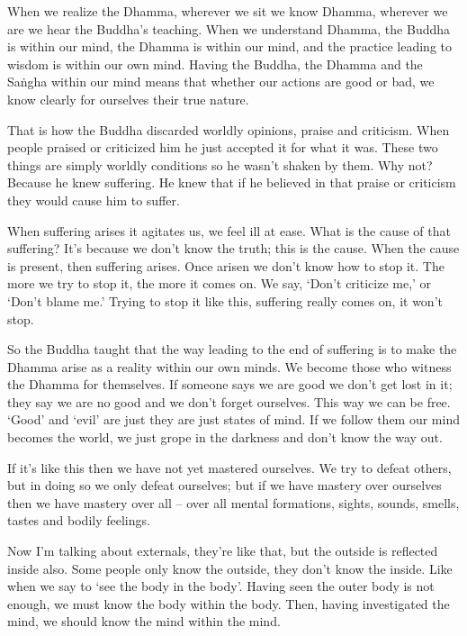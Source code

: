 When we realize the Dhamma, wherever we sit we know Dhamma, wher\-ever we are we hear the Buddha's teaching. When we understand Dhamma, the Buddha is within our mind, the Dhamma is within our mind, and the practice leading to wisdom is within our own mind. Having the Buddha, the Dhamma and the Sa\.ngha within our mind means that whether our actions are good or bad, we know clearly for ourselves their true nature.

That is how the Buddha discarded worldly opinions, praise and criticism. When people praised or criticized him he just accepted it for what it was. These two things are simply worldly conditions so he wasn't shaken by them. Why not? Because he knew suffering. He knew that if he believed in that praise or criticism they would cause him to suffer.

When suffering arises it agitates us, we feel ill at ease. What is the cause of that suffering? It's because we don't know the truth; this is the cause. When the cause is present, then suffering arises. Once arisen we don't know how to stop it. The more we try to stop it, the more it comes on. We say, `Don't criticize me,' or `Don't blame me.' Trying to stop it like this, suffering really comes on, it won't stop.

So the Buddha taught that the way leading to the end of suffering is to make the Dhamma arise as a reality within our own minds. We become those who witness the Dhamma for themselves. If someone says we are good we don't get lost in it; they say we are no good and we don't forget ourselves. This way we can be free. `Good' and `evil' are just  they are just states of mind. If we follow them our mind becomes the world, we just grope in the darkness and don't know the way out.

If it's like this then we have not yet mastered ourselves. We try to defeat others, but in doing so we only defeat ourselves; but if we have mastery over ourselves then we have mastery over all -- over all mental formations, sights, sounds, smells, tastes and bodily feelings.

Now I'm talking about externals, they're like that, but the outside is reflected inside also. Some people only know the outside, they don't know the inside. Like when we say to `see the body in the body'. Having seen the outer body is not enough, we must know the body within the body. Then, having investigated the mind, we should know the mind within the mind.

